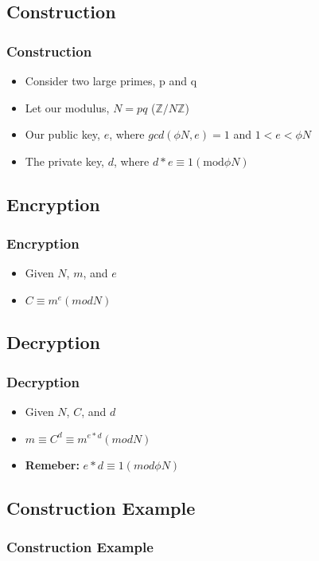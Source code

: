 \documentclass{beamer}
\begin{document}
\subsection{Construction}
\begin{frame}
    \frametitle{Construction}
    \begin{itemize}
        \item Consider two large primes, p and q
        \item Let our modulus, $N = pq$ ($\mathbb{Z}/N\mathbb{Z}$)
        \item Our public key, $e$, where $gcd(\phi{N},e) = 1$ and $1 < e < \phi{N}$
        \item The private key, $d$, where $d*e \equiv 1 (\textrm{mod} \phi{N})$
    \end{itemize}
\end{frame}

\subsection{Encryption}
\begin{frame}
    \frametitle{Encryption}
    \begin{itemize}
        \item Given $N$, $m$, and $e$
        \item $C \equiv m^{e} (mod N)$
    \end{itemize}
\end{frame}

\subsection{Decryption}
\begin{frame}
    \frametitle{Decryption}
    \begin{itemize}
        \item Given $N$, $C$, and $d$
        \item $m \equiv C^{d} \equiv m^{e*d} (mod N)$
        \item \textbf{Remeber:} $e*d \equiv 1 (mod \phi{N})$
    \end{itemize}
\end{frame}

\subsection{Construction Example}
\begin{frame}
  \frametitle{Construction Example}
\end{frame}
\end{document}
